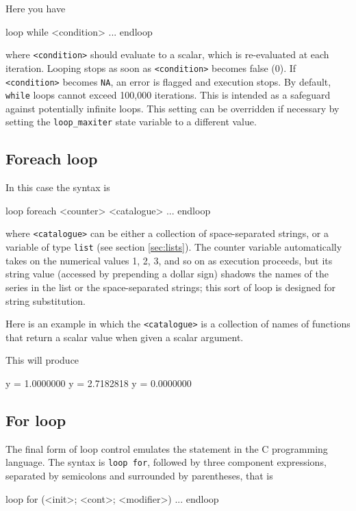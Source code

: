Here you have
\begin{code}
loop while <condition>
   ...
endloop
\end{code}
where \texttt{<condition>} should evaluate to a scalar, which is
re-evaluated at each iteration. Looping stops as soon as
\texttt{<condition>} becomes false (0). If \texttt{<condition>}
becomes \texttt{NA}, an error is flagged and execution stops.  By
default, \texttt{while} loops cannot exceed 100,000 iterations. This is
intended as a safeguard against potentially infinite loops. This
setting can be overridden if necessary by setting the
\texttt{loop\_maxiter} state variable to a different value.

\subsection{Foreach loop}
\label{sec:loop-foreach}

In this case the syntax is
\begin{code}
loop foreach <counter> <catalogue>
   ...
endloop
\end{code}
where \texttt{<catalogue>} can be either a collection of
space-separated strings, or a variable of type \texttt{list} (see
section \ref{sec:lists}). The counter variable automatically takes on
the numerical values 1, 2, 3, and so on as execution proceeds, but its
string value (accessed by prepending a dollar sign) shadows the names
of the series in the list or the space-separated strings; this sort of
loop is designed for string substitution.

Here is an example in which the \texttt{<catalogue>} is a collection
of names of functions that return a scalar value when given a scalar
argument.
This will produce
\begin{code}
              y =  1.0000000
              y =  2.7182818
              y =  0.0000000
\end{code}

\subsection{For loop}

The final form of loop control emulates the  statement in the
C programming language.  The syntax is \texttt{loop for}, followed by
three component expressions, separated by semicolons and surrounded by
parentheses, that is
\begin{code}
loop for (<init>; <cont>; <modifier>)
   ...
endloop
\end{code}

